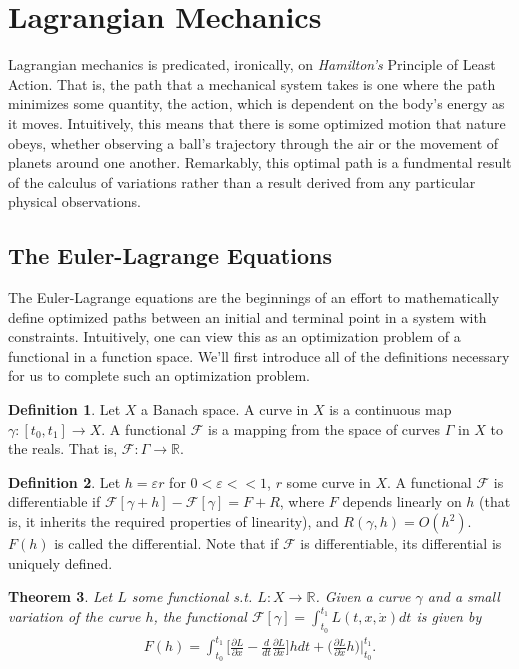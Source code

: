 \documentclass[10pt, psamsfonts]{amsart}
\newtheorem{thm}{Theorem}[section]
\theoremstyle{definition}
\newtheorem{defn}[thm]{Definition}
\theoremstyle{remark}
\numberwithin{equation}{section}
\begin{document}
\section{Lagrangian Mechanics}
Lagrangian mechanics is predicated, ironically, on \textit{Hamilton's} Principle of Least Action. That is, the path that a mechanical system takes is one where the path minimizes some quantity, the action, which is dependent on the body's energy as it moves. Intuitively, this means that there is some optimized motion that nature obeys, whether observing a ball's trajectory through the air or the movement of planets around one another. Remarkably, this optimal path is a fundmental result of the calculus of variations rather than a result derived from any particular physical observations.

\subsection{The Euler-Lagrange Equations}
The Euler-Lagrange equations are the beginnings of an effort to mathematically define optimized paths between an initial and terminal point in a system with constraints. Intuitively, one can view this as an optimization problem of a functional in a function space. We'll first introduce all of the definitions necessary for us to complete such an optimization problem.
\begin{defn}
  Let $X$ a Banach space. A curve in $X$ is a continuous map $\gamma : [t_0, t_1] \to X$. A functional $\mathcal{F}$ is a mapping from the space of curves $\Gamma$ in $X$ to the reals. That is, $\mathcal{F}:\Gamma \to \mathbb{R}$.
\end{defn}
\begin{defn}
  Let $h = \varepsilon r$ for $0 < \varepsilon << 1$, $r$ some curve in $X$. A functional $\mathcal{F}$ is differentiable if $\mathcal{F}[\gamma + h] - \mathcal{F}[\gamma] = F + R$, where $F$ depends linearly on $h$ (that is, it inherits the required properties of linearity), and $R(\gamma, h) = O(h^2)$. $F(h)$ is called the differential. Note that if $\mathcal{F}$ is differentiable, its differential is uniquely defined.
\end{defn}

\begin{thm}
  Let $L$ some functional s.t. $L:X\to \mathbb{R}$. Given a curve $\gamma$ and a small variation of the curve $h$, the functional $\mathcal{F}[\gamma] = \int_{t_0}^{t_1} L(t, x, \dot{x})dt$ is given by
  \begin{align*}
    F(h) = \int_{t_0}^{t_1} \bigg[\frac{\partial L}{\partial x} - \frac{d}{dt} \frac{\partial L}{\partial \dot{x}}  \bigg] h dt + \bigg(\frac{\partial L}{\partial \dot{x}}h \bigg)\bigg|_{t_0}^{t_1}.
  \end{align*}
\end{thm}
\end{document}
